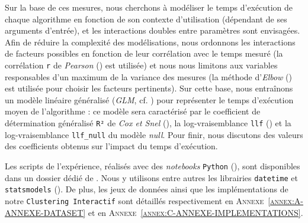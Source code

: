 			Sur la base de ces mesures, nous cherchons à modéliser le temps d'exécution de chaque algorithme en fonction de son contexte d'utilisation (dépendant de ses arguments d'entrée), et les interactions doubles entre paramètres sont envisagées.
			Afin de réduire la complexité des modélisations, nous ordonnons les interactions de facteurs possibles en fonction de leur corrélation avec le temps mesuré (la corrélation \texttt{r} de \textit{Pearson} (\cite{kirch:2008:pearson-correlation-coefficient}) est utilisée) et nous nous limitons aux variables responsables d'un maximum de la variance des mesures (la méthode d'\textit{Elbow} (\cite{thorndike:1953:who-belongs-family}) est utilisée pour choisir les facteurs pertinents).
			Sur cette base, nous entraînons un modèle linéaire généralisé (\textit{GLM}, cf. \cite{nelder-wedderburn:1972:generalized-linear-models}) pour représenter le temps d'exécution moyen de l'algorithme : ce modèle sera caractérisé par le coefficient de détermination généralisé \texttt{R²} de \textit{Cox et Snel} (\cite{diamond-etal:1990:analysis-binary-data}), la log-vraisemblance \texttt{llf} (\cite{edwards:1992:likelihood}) et la log-vraisemblance \texttt{llf\_null} du modèle \textit{null}.
			Pour finir, nous discutons des valeurs des coefficients obtenus sur l'impact du temps d'exécution.
			
			\setcounter{localCounterOfFootnoteValue}{\value{footnote}}
			\begin{leftBarInformation}
				Les scripts de l'expérience, réalisés avec des \textit{notebooks} \texttt{Python} (\cite{van-rossum-drake:2009:python-reference-manual}), sont disponibles dans un dossier dédié de \cite{schild:2021:cognitivefactory-interactiveclusteringcomparativestudy}.
				Nous y utilisons entre autres les librairies \texttt{datetime} \footnotemark et \texttt{statsmodels} \footnotemark (\cite{seabold-perktold:2010:statsmodels-econometric-statistical}).
				De plus, les jeux de données ainsi que les implémentations de notre \texttt{Clustering Interactif} sont détaillés respectivement en \textsc{Annexe~\ref{annex:A-ANNEXE-DATASET}} et en \textsc{Annexe~\ref{annex:C-ANNEXE-IMPLEMENTATIONS}}.
			\end{leftBarInformation}


